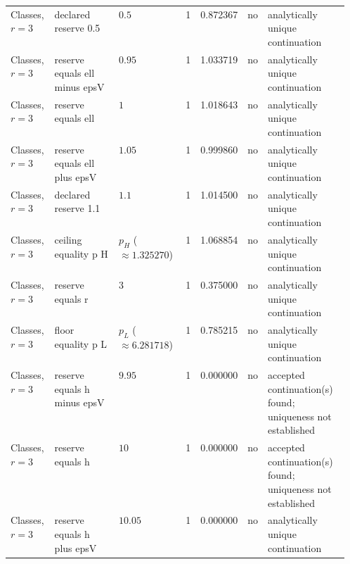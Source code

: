 \begin{landscape}
\begin{longtable}{@{}p{0.13\linewidth}p{0.19\linewidth}lrrlp{0.24\linewidth}@{}}
Classes, $r=3$ & declared reserve 0.5 & $0.5$ & 1 & 0.872367 & no & analytically unique continuation \\
Classes, $r=3$ & reserve equals ell minus epsV & $0.95$ & 1 & 1.033719 & no & analytically unique continuation \\
Classes, $r=3$ & reserve equals ell & $1$ & 1 & 1.018643 & no & analytically unique continuation \\
Classes, $r=3$ & reserve equals ell plus epsV & $1.05$ & 1 & 0.999860 & no & analytically unique continuation \\
Classes, $r=3$ & declared reserve 1.1 & $1.1$ & 1 & 1.014500 & no & analytically unique continuation \\
Classes, $r=3$ & ceiling equality p H & $p_H$ ($\approx 1.325270$) & 1 & 1.068854 & no & analytically unique continuation \\
Classes, $r=3$ & reserve equals r & $3$ & 1 & 0.375000 & no & analytically unique continuation \\
Classes, $r=3$ & floor equality p L & $p_L$ ($\approx 6.281718$) & 1 & 0.785215 & no & analytically unique continuation \\
Classes, $r=3$ & reserve equals h minus epsV & $9.95$ & 1 & 0.000000 & no & accepted continuation(s) found; uniqueness not established \\
Classes, $r=3$ & reserve equals h & $10$ & 1 & 0.000000 & no & accepted continuation(s) found; uniqueness not established \\
Classes, $r=3$ & reserve equals h plus epsV & $10.05$ & 1 & 0.000000 & no & analytically unique continuation \\
\end{longtable}\endgroup\end{landscape}
